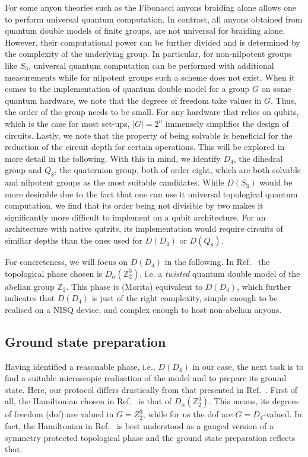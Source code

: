 \documentclass[two column]{article}
\begin{document}
For some anyon theories such as the Fibonacci anyons braiding alone allows one to perform universal quantum computation\cite{Freedman2002}. In contrast, all anyons obtained from quantum double models of finite groups, are not universal for braiding alone. However, their computational power can be further divided and is determined by the complexity of the underlying group. In particular, for non-nilpotent groups like $S_3$, universal quantum computation can be performed with additional measurements\cite{Mochon2004} while for nilpotent groups such a scheme does not exist. 
When it comes to the implementation of quantum double model for a group $G$ on some quantum hardware, we note that the degrees of freedom take values in $G$. Thus, the order of the group needs to be small. For any hardware that relies on qubits, which is the case for most set-ups, $|G|=2^n$ immensely simplifies the design of circuits. Lastly, we note that the property of being solvable is beneficial for the reduction of the circuit depth for certain operations. This will be explored in more detail in the following. 
With this in mind, we identify $D_4$, the dihedral group and $Q_8$, the quaternion group, both of order eight, which are both solvable and nilpotent groups as the most suitable candidates.
While $D(S_3)$ would be more desirable due to the fact that one can use it universal topological quantum computation, we find that its order being not divisible by two makes it significantly more difficult to implement on a qubit architecture. For an architecture with native qutrits, its implementation would require circuits of similiar depths than the ones used for $D(D_4)$ or $D(Q_8)$.

For concreteness, we will focus on $D(D_4)$ in the following. In Ref.~\cite{iqbal2023creation} the topological phase chosen is $D_\alpha(\mathbb Z_2^3)$, i.e. a \emph{twisted} quantum double model of the abelian group $\mathbb Z_2$. This phase is (Morita) equivalent to $D(D_4)$\cite{mapping, propitius1995topological}, which further indicates that $D(D_4)$ is just of the right complexity, simple enough to be realised on a NISQ device, and complex enough to host non-abelian anyons.
\subsection{Ground state preparation}
Having identified a reasonable phase, i.e., $D(D_4)$ in our case, the next task is to find a suitable microscopic realisation of the model and to prepare its ground state. Here, our protocol differs drastically from that presented in Ref.~\cite{iqbal2023creation}. First of all, the Hamiltonian chosen in Ref.~\cite{iqbal2023creation} is that of $D_\alpha(\mathbb Z_2^3)$. This means, its degrees of freedom (dof) are valued in $G=Z_2^3$, while for us the dof are $G=D_4$-valued. In fact, the Hamiltonian in Ref.~\cite{iqbal2023creation} is best understood as a gauged version of a symmetry protected topological phase and the ground state preparation reflects that. 
\end{document}
